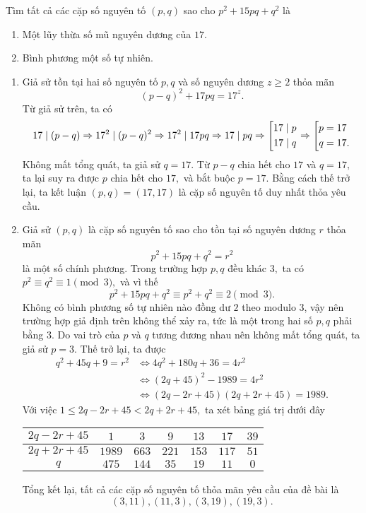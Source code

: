 \begin{gbtt}
Tìm tất cả các cặp số nguyên tố $(p,q)$ sao cho $p^2+15pq+q^2$ là
\begin{enumerate}[a,]
	\item Một lũy thừa số mũ nguyên dương của $17.$
	\item Bình phương một số tự nhiên.
\end{enumerate}
\loigiai
{\begin{enumerate}[a,]
	\item Giả sử tồn tại hai số nguyên tố $p,q$ và số nguyên dương $z\ge 2$ thỏa mãn
        $$(p-q)^2+17pq=17^z.$$
    Từ giả sử trên, ta có
    $$17\mid(p-q)\Rightarrow 17^2\mid (p-q)^2\Rightarrow 17^2\mid 17pq \Rightarrow 17\mid pq\Rightarrow\left[\begin{aligned}17\mid p\\ 17\mid q\end{aligned}\right.\Rightarrow \left[\begin{aligned}p&=17\\ q&=17.\end{aligned}\right.$$
    Không mất tổng quát, ta giả sử $q=17.$ Từ $p-q$ chia hết cho $17$ và $q=17,$ ta lại suy ra được $p$ chia hết cho $17,$ và bắt buộc $p=17.$ Bằng cách thế trở lại, ta kết luận $(p,q)=(17,17)$ là cặp số nguyên tố duy nhất thỏa yêu cầu.
	\item Giả sử $(p,q)$ là cặp số nguyên tố sao cho tồn tại số nguyên dương $r$ thỏa mãn
		$$p^2+15pq+q^2=r^2$$
	là một số chính phương. Trong trường hợp $p,q$ đều khác $3,$ ta có $p^2\equiv q^2 \equiv 1 \pmod{3},$ và vì thế
		\[p^2+15pq+q^2\equiv p^2+q^2\equiv 2\pmod{3}.\]
	Không có bình phương số tự nhiên nào đồng dư $2$ theo modulo $3$, vậy nên trường hợp giả định trên không thể xảy ra, tức là một trong hai số $p,q$ phải bằng $3.$ Do vai trò của $p$ và $q$ tương đương nhau nên không mất tổng quát, ta giả sử $p=3$. Thế trở lại, ta được
		\begin{align*} 
		q^2+45q+9=r^2&\Leftrightarrow 4q^2+180q+36=4r^2\\
			& \Leftrightarrow(2q+45)^2-1989=4r^2\\
			&\Leftrightarrow (2q-2r+45)(2q+2r+45)=1989.
		\end{align*}
		Với việc $1\le 2q-2r+45<2q+2r+45,$ ta xét bảng giá trị dưới đây
		\begin{center}
		\begin{tabular}{c|c|c|c|c|c|c}
			 $2q-2r+45$ & $1$ & $3$ & $9$ & $13$ & $17$ & $39$  \\
			     \hline
			 $2q+2r+45$ & $1989$ & $663$ & $221$ & $153$ & $117$ & $51$ \\
			     \hline
			 $q$ & $475$ & $144$ & $35$ & $19$ & $11$ & $0$
		\end{tabular}
		\end{center}
	    Tổng kết lại, tất cả các cặp số nguyên tố thỏa mãn yêu cầu của đề bài là \[(3,11),(11,3),(3,19),(19,3).\]
\end{enumerate}}
\end{gbtt}

